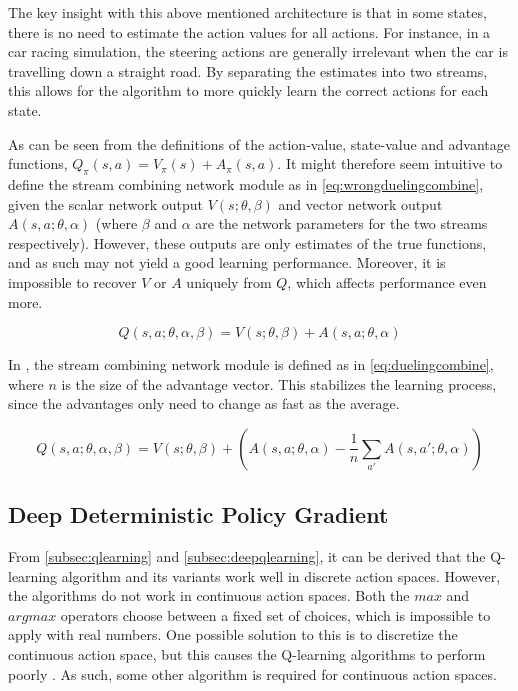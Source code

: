 \documentclass{kththesis}
\begin{document}
The key insight with this above mentioned architecture is that in some states, there is no need to estimate the action values for all actions. For instance, in a car racing simulation, the steering actions are generally irrelevant when the car is travelling down a straight road. By separating the estimates into two streams, this allows for the algorithm to more quickly learn the correct actions for each state. \parencite{wang2015dueling}

As can be seen from the definitions of the action-value, state-value and advantage functions, $Q_\pi(s, a) = V_\pi(s) + A_\pi(s, a)$. It might therefore seem intuitive to define the stream combining network module as in \autoref{eq:wrongduelingcombine}, given the scalar network output $V(s;\theta,\beta)$ and vector network output $A(s, a;\theta, \alpha)$ (where $\beta$ and $\alpha$ are the network parameters for the two streams respectively). However, these outputs are only estimates of the true functions, and as such may not yield a good learning performance. Moreover, it is impossible to recover $V$ or $A$ uniquely from $Q$, which affects performance even more. \parencite{wang2015dueling}

\begin{equation}
\label{eq:wrongduelingcombine}
Q(s,a;\theta,\alpha,\beta) = V(s;\theta,\beta) + A(s, a;\theta, \alpha)
\end{equation}

In \parencite{wang2015dueling}, the stream combining network module is defined as in \autoref{eq:duelingcombine}, where $n$ is the size of the advantage vector. This stabilizes the learning process, since the advantages only need to change as fast as the average. 

\begin{equation}
\label{eq:duelingcombine}
Q(s,a;\theta,\alpha,\beta) = V(s;\theta,\beta) + (A(s, a;\theta, \alpha) - \frac{1}{n}\sum_{a'}A(s, a';\theta, \alpha))
\end{equation}

\subsection{Deep Deterministic Policy Gradient}
From \autoref{subsec:qlearning} and \autoref{subsec:deepqlearning}, it can be derived that the Q-learning algorithm and its variants work well in discrete action spaces. However, the algorithms do not work in continuous action spaces. Both the $max$ and $argmax$ operators choose between a fixed set of choices, which is impossible to apply with real numbers. One possible solution to this is to discretize the continuous action space, but this causes the Q-learning algorithms to perform poorly \parencite{lillicrap2015continuous}. As such, some other algorithm is required for continuous action spaces.
\end{document}
